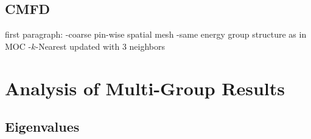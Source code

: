 \subsection{\ac{CMFD}}
\label{subsec:chap8-cmfd}

first paragraph:
-coarse pin-wise spatial mesh
-same energy group structure as in \ac{MOC}
-$k$-Nearest updated with 3 neighbors


\section{Analysis of Multi-Group Results}
\label{sec:chap8-mg-results}


\subsection{Eigenvalues}
\label{subsec:chap8-eigenvalues}

